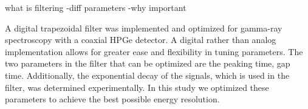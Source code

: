 what is filtering
-diff parameters
-why important

A digital trapezoidal filter was implemented and optimized for gamma-ray spectroscopy with a coaxial HPGe detector. A digital rather than analog implementation allows for greater ease and flexibility in tuning parameters. The two parameters in the filter that can be optimized are the peaking time, gap time. Additionally, the exponential decay of the signals, which is used in the filter, was determined experimentally. In this study we optimized these parameters to achieve the best possible energy resolution.